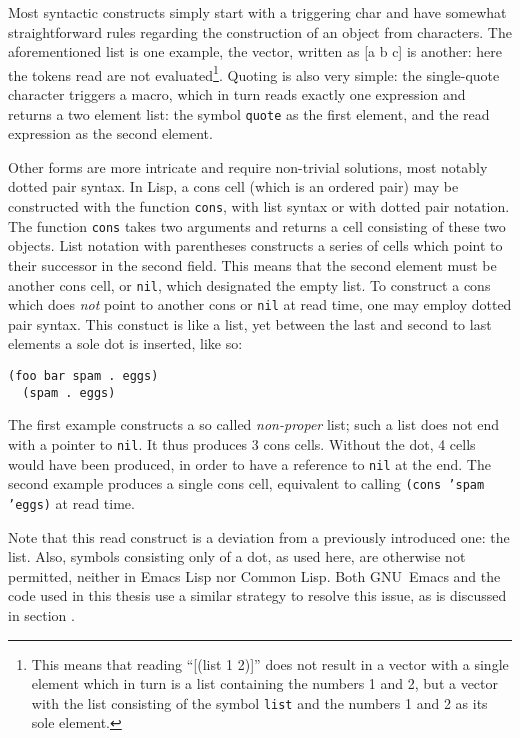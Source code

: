 \documentclass[a4paper,10pt,twoside]{report}
\newcommand{\el}{Emacs Lisp}
\newcommand{\cl}{Common Lisp}
\newcommand{\sym}[1]{\texttt{#1}}
\newcommand{\fun}[1]{\texttt{#1}}
\newcommand{\emacs}{GNU~Emacs}
\newcommand{\nil}{\sym{nil}}
\begin{document}
Most syntactic constructs simply start with a triggering char and have somewhat
straightforward rules regarding the construction of an object from characters.
The aforementioned list is one example, the vector, written as [a b c] is
another: here the tokens read are not evaluated\footnote{This means that reading
``[(list 1 2)]'' does not result in a vector with a single element which in turn
is a list containing the numbers 1 and 2, but a vector with the list consisting
of the symbol \sym{list} and the numbers 1 and 2 as its sole element.}.  Quoting
is also very simple: the single-quote character triggers a macro, which in turn
reads exactly one expression and returns a two element list: the symbol
\sym{quote} as the first element, and the read expression as the second element.

Other forms are more intricate and require non-trivial solutions, most notably
dotted pair syntax.  In Lisp, a cons cell (which is an ordered pair) may be
constructed with the function \fun{cons}, with list syntax or with dotted pair
notation.  The function \fun{cons} takes two arguments and returns a cell
consisting of these two objects.  List notation with parentheses constructs a
series of cells which point to their successor in the second field.  This means
that the second element must be another cons cell, or \nil{}, which designated the
empty list.  To construct a cons which does \emph{not} point to another cons or
\nil{} at read time, one may employ dotted pair syntax.  This constuct is like a
list, yet between the last and second to last elements a sole dot is inserted,
like so:

\begin{lstlisting}[style=lispinline]
  (foo bar spam . eggs)
  (spam . eggs)
\end{lstlisting}

The first example constructs a so called \emph{non-proper} list; such a list
does not end with a pointer to \nil{}.  It thus produces 3 cons cells.  Without
the dot, 4 cells would have been produced, in order to have a reference to
\nil{} at the end.  The second example produces a single cons cell, equivalent
to calling \texttt{(cons 'spam 'eggs)} at read time.

Note that this read construct is a deviation from a previously introduced one:
the list.  Also, symbols consisting only of a dot, as used here, are otherwise
not permitted, neither in \el{} nor \cl{}.  Both \emacs{} and the code used in
this thesis use a similar strategy to resolve this issue, as is discussed in
section .
\end{document}
